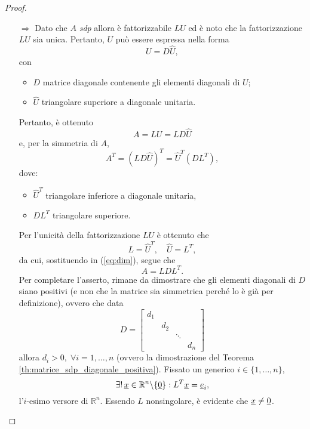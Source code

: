 \begin{proof}
\begin{itemize}
        \item[$\Rightarrow$] Dato che $A$ \textit{sdp} allora è fattorizzabile $LU$ ed è noto che la fattorizzazione $LU$ sia unica. Pertanto, $U$ può essere espressa nella forma
        \begin{equation*}
            U=D\widehat U,
        \end{equation*}
        con
        \begin{itemize}
        	\item  $D$ matrice diagonale contenente gli elementi diagonali di $U$;
        	\item $\widehat U$ triangolare superiore a diagonale unitaria.
        \end{itemize}
        
        Pertanto, è ottenuto
        \begin{equation*}
            A = LU= LD\widehat U
        \end{equation*}
        e, per la simmetria di $A$,
        \begin{equation}\label{eq:dim}
        	A^T =\left(LD\widehat U\right)^T =  \widehat U^T\left(D L^T\right),
        \end{equation}
        dove:
        \begin{itemize}
            \item $\widehat U^T$ triangolare inferiore a diagonale unitaria,
            \item $DL^T$ triangolare superiore.
        \end{itemize}
        Per l'unicità della fattorizzazione $LU$ è ottenuto che
        \begin{equation*}
            L=\widehat U^T,\quad \widehat U=L^T,
        \end{equation*}
        da cui, sostituendo in (\ref{eq:dim}), segue che
        \begin{equation*}
        	A=LDL^T.
        \end{equation*}
        Per completare l'asserto, rimane da dimostrare che gli elementi diagonali di $D$ siano positivi (e non che la matrice sia simmetrica perché lo è già per definizione), ovvero che data
        \begin{equation*}
            D=
            \begin{bmatrix}
                d_1 \\
                & d_2\\
                & & \ddots \\
                & & & d_n
          \end{bmatrix}
        \end{equation*}
        allora $d_i>0,\; \forall i = 1,\hdots,n$ (ovvero la dimostrazione del Teorema \ref{th:matrice_sdp_diagonale_positiva}).
        Fissato un generico $i\in\{1,\hdots, n\}$,
        \begin{equation*}
        	\exists!\, \uline x\in\mathbb R^n\backslash\{\uline 0\}:L^T\uline x=\uline e_i,
        \end{equation*}
        l'$i$-esimo versore di $\mathbb R^n$.  Essendo $L$ \gls{nonsingolare}, è evidente che $\uline x \neq \uline 0$.
        

\end{itemize}
\end{proof}
